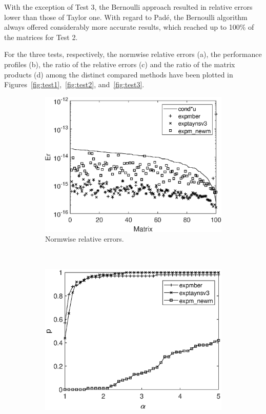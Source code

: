 \documentclass[preprint,10pt,numbers,sort&compress]{elsarticle}
\begin{document}
With the exception of Test 3, the Bernoulli approach resulted in relative errors lower than those of Taylor one. With regard to Pad\'e, the Bernoulli algorithm always offered considerably more accurate results, which reached up to 100\% of the matrices for Test 2.

For the three tests, respectively, the normwise relative errors (a), the performance profiles (b), the ratio of the relative errors (c) and the ratio of the matrix products (d) among the distinct compared methods have been plotted in Figures~\ref{fig:test1},~\ref{fig:test2}, and~\ref{fig:test3}.

\begin{figure}[t]
\centering
\begin{subfigure}[b]{0.48\textwidth}
\includegraphics[scale=0.44]{Figures/normwise_exp_diag_hadamard_complex_n128_nd256_expmber.eps}
\caption{\footnotesize Normwise relative errors.} \label{fig:test1_a} \vspace{12pt}
\end{subfigure} \ \
\begin{subfigure}[b]{0.48\textwidth}
\includegraphics[scale=0.44]{Figures/nprofile_exp_diag_hadamard_complex_n128_nd256_expmber.eps}

\end{subfigure}
\end{figure}
\end{document}
